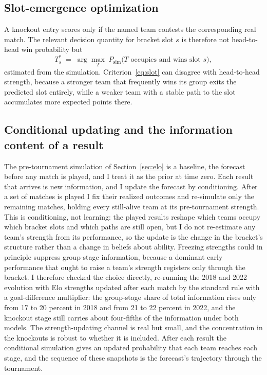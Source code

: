 \documentclass[11pt,a4paper]{article}
\begin{document}
\subsection{Slot-emergence optimization}\label{sec:slot}

A knockout entry scores only if the named team contests the corresponding real match. The relevant decision quantity for bracket slot $s$ is therefore not head-to-head win probability but
\begin{equation}
T^\ast_s \;=\; \arg\max_T \; P_{\mathrm{sim}}\bigl(T \text{ occupies and wins slot } s\bigr),
\label{eq:slot}
\end{equation}
estimated from the simulation. Criterion~\eqref{eq:slot} can disagree with head-to-head strength, because a stronger team that frequently wins its group exits the predicted slot entirely, while a weaker team with a stable path to the slot accumulates more expected points there.

\subsection{Conditional updating and the information content of a result}\label{sec:updating}

The pre-tournament simulation of Section~\ref{sec:elo} is a baseline, the forecast before any match is played, and I treat it as the prior at time zero. Each result that arrives is new information, and I update the forecast by conditioning. After a set of matches is played I fix their realized outcomes and re-simulate only the remaining matches, holding every still-alive team at its pre-tournament strength. This is conditioning, not learning: the played results reshape which teams occupy which bracket slots and which paths are still open, but I do not re-estimate any team's strength from its performance, so the update is the change in the bracket's structure rather than a change in beliefs about ability. Freezing strengths could in principle suppress group-stage information, because a dominant early performance that ought to raise a team's strength registers only through the bracket. I therefore checked the choice directly, re-running the 2018 and 2022 evolution with Elo strengths updated after each match by the standard rule with a goal-difference multiplier: the group-stage share of total information rises only from 17 to 20 percent in 2018 and from 21 to 22 percent in 2022, and the knockout stage still carries about four-fifths of the information under both models. The strength-updating channel is real but small, and the concentration in the knockouts is robust to whether it is included. After each result the conditional simulation gives an updated probability that each team reaches each stage, and the sequence of these snapshots is the forecast's trajectory through the tournament.
\end{document}
